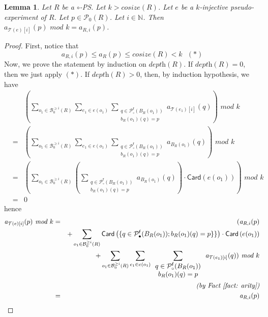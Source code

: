 \documentclass{article}
\theoremstyle{plain}
\newtheorem{lem}[theorem]{Lemma}
\newcommand{\Nat}{\ensuremath{\mathbb{N}}}
\newcommand{\taylor}[2]{\mathcal{T}(#1)[#2]}
\newcommand{\cosize}[1]{\textit{cosize}(#1)}
\newcommand{\depthof}[1]{\textit{depth}(#1)}
\newcommand{\portsatzero}[1]{\mathcal{P}_0(#1)}
\newcommand{\arity}[1]{{\textit{a}}_{#1}}
\newcommand{\Card}[1]{\textsf{Card}\left( #1 \right)}
\newcommand{\conclusionscirc}[1]{\mathcal{P}_\circ^{\textsf{f}}(#1)}
\newcommand{\conclusionsnotcirc}[1]{\mathcal{P}_\bullet^{\textsf{f}}(#1)}
\newcommand{\boxesatzerogeq}[2]{\mathcal{B}_0^{\geq #2}(#1)}
\begin{document}
\begin{lem}\label{lemma: m_{k, 0}(c)}
Let $R$ be a $\circ$-PS. Let $k > \cosize{R}$. Let $e$ be a $k$-injective pseudo-experiment of $R$. Let $p \in \portsatzero{R}$. Let $i \in \Nat$. Then $\arity{\taylor{e}{i}}(p) \textit{ mod }k = \arity{R, i}(p)$.
\end{lem}

\begin{proof}
First, notice that 
$$\arity{R, i}(p) \leq \arity{R}(p) \leq \cosize{R} < k \: \: \: (\ast)$$
Now, we prove the statement by induction on $\depthof{R}$. If $\depthof{R} = 0$, then we just apply $(\ast)$. If $\depthof{R} > 0$, then, by induction hypothesis, we have
\begin{eqnarray*}
& & (\sum_{o_1 \in \boxesatzerogeq{R}{i}} \sum_{e_1 \in e(o_1)} \sum_{\begin{array}{c} q \in \conclusionscirc{B_R(o_1)}\\ b_R(o_1)(q) = p \end{array}} \arity{\taylor{e_1}{i}}(q)) \textit{ mod } k\\
& = & (\sum_{o_1 \in \boxesatzerogeq{R}{i}} \sum_{e_1 \in e(o_1)} \sum_{\begin{array}{c} q \in \conclusionscirc{B_R(o_1)}\\ b_R(o_1)(q) = p \end{array}} \arity{B_R(o_1)}(q)) \textit{ mod } k\\
& = & (\sum_{o_1 \in \boxesatzerogeq{R}{i}} (\sum_{\begin{array}{c} q \in \conclusionscirc{B_R(o_1)}\\ b_R(o_1)(q) = p \end{array}} \arity{B_R(o_1)}(q)) \cdot \Card{e(o_1)}) \textit{ mod } k\\
& = & 0
\end{eqnarray*}
hence
\begin{eqnarray*}
\arity{\taylor{e}{i}}(p) \textit{ mod } k & = & (\arity{R, i}(p)\\
& & + \sum_{o_1 \in \boxesatzerogeq{R}{i}} \Card{\{ q \in \conclusionsnotcirc{B_R(o_1)} ; b_R(o_1)(q) = p \}\}} \cdot \Card{e(o_1)}\\
& & + \sum_{o_1 \in \boxesatzerogeq{R}{i}} \sum_{e_1 \in e(o_1)} \sum_{\begin{array}{c} q \in \conclusionscirc{B_R(o_1)}\\ b_R(o_1)(q) = p \end{array}} \arity{\taylor{e_1}{i}}(q)) \textit{ mod } k\\
& & \textit{(by Fact~\ref{fact: arity})}\\
& = & \arity{R, i}(p)
\end{eqnarray*}
\end{proof}
\end{document}
